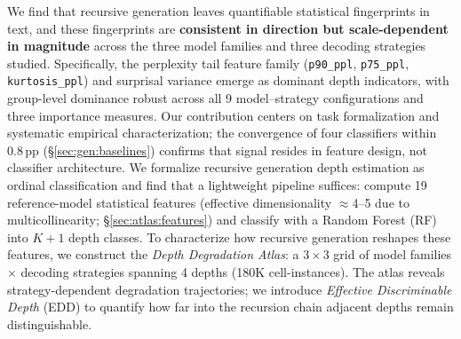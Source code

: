 We find that recursive generation leaves quantifiable statistical fingerprints in text, and these fingerprints are \textbf{consistent in direction but scale-dependent in magnitude} across the three model families and three decoding strategies studied.
Specifically, the perplexity tail feature family (\texttt{p90\_ppl}, \texttt{p75\_ppl}, \texttt{kurtosis\_ppl}) and surprisal variance emerge as dominant depth indicators, with group-level dominance robust across all 9 model--strategy configurations and three importance measures.
Our contribution centers on task formalization and systematic empirical characterization; the convergence of four classifiers within 0.8\,pp (\S\ref{sec:gen:baselines}) confirms that signal resides in feature design, not classifier architecture.
We formalize recursive generation depth estimation as ordinal classification and find that a lightweight pipeline suffices: compute 19 reference-model statistical features (effective dimensionality ${\approx}$4--5 due to multicollinearity; \S\ref{sec:atlas:features}) and classify with a Random Forest (RF) into $K{+}1$ depth classes.
To characterize how recursive generation reshapes these features, we construct the \emph{Depth Degradation Atlas}: a $3 \times 3$ grid of model families $\times$ decoding strategies spanning 4 depths (180K cell-instances).
The atlas reveals strategy-dependent degradation trajectories; we introduce \emph{Effective Discriminable Depth} (EDD) to quantify how far into the recursion chain adjacent depths remain distinguishable.

